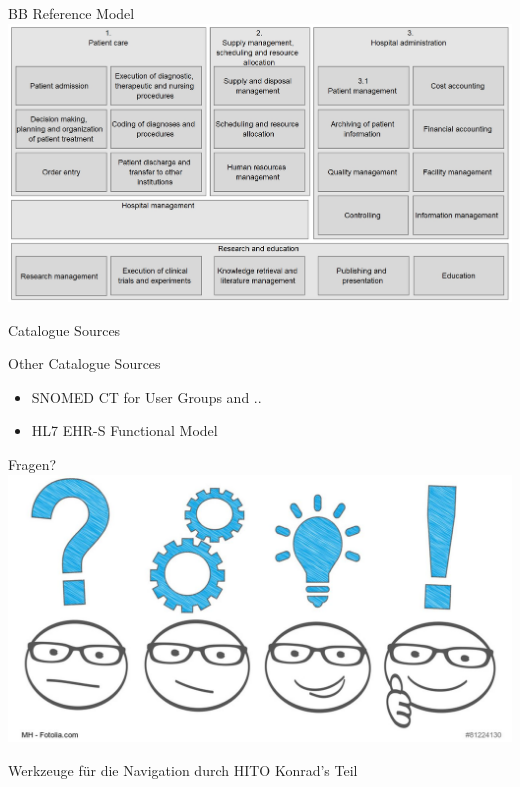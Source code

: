 \documentclass[aspectratio=1610,12pt]{beamer}
\begin{document}
\begin{frame}{BB Reference Model}
  \centering
  \includegraphics[width=\textwidth]{img/rmdl.png}
\end{frame}

\begin{frame}{Catalogue Sources}
\begin{spacing}{1.5}
  Other Catalogue Sources
  \begin{itemize}
    \item SNOMED CT for User Groups and ..
    \item HL7 EHR-S Functional Model
  \end{itemize}
\end{spacing}
\end{frame}

\begin{frame}{Fragen?}
  \centering
  \vspace{-0.5cm}
  \includegraphics[width=\textwidth]{img/fragen.png}
\end{frame}

\begin{frame}{Werkzeuge für die Navigation durch HITO}
  \centering
  \huge Konrad's Teil
\end{frame}
\end{document}
